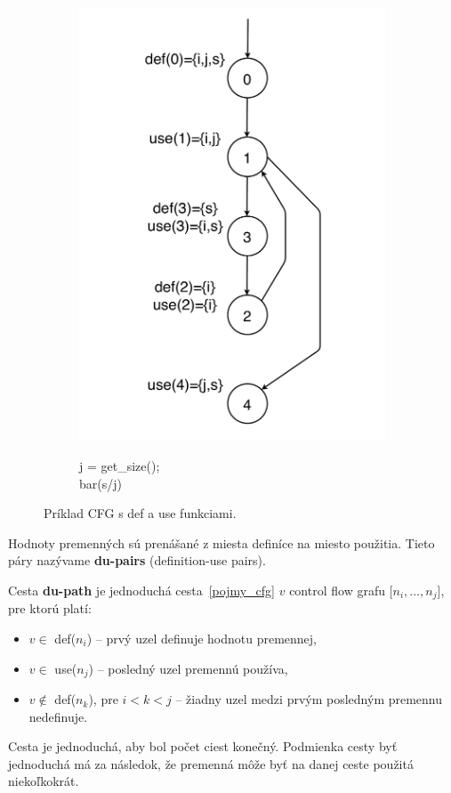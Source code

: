 \begin{figure}[H]
	\begin{subfigure}{0.5\linewidth}
		\centering
		\includegraphics[width=0.8\linewidth]{obrazky/cfg_def_use.pdf}
	\end{subfigure}
	\quad
	\begin{subfigure}{0.5\linewidth}
		\centering
		\begin{algorithm}[H]
			\DontPrintSemicolon
			\LinesNotNumbered
			 j = get\_size(); \\
			bar(s/j)
		\end{algorithm}
	\end{subfigure}
	\caption{Príklad CFG s def a use funkciami.}
\end{figure}

Hodnoty premenných sú prenášané z miesta definíce na miesto použitia.
Tieto páry nazývame \textbf{du-pairs} (definition-use pairs).

Cesta \textbf{du-path} je jednoduchá cesta~\ref{pojmy_cfg} $v$ control flow grafu [$n_i, \ldots, n_j$], pre ktorú platí:
\begin{itemize}
	\item $v \in$ def($n_i$) -- prvý uzel definuje hodnotu premennej,
	\item $v \in$ use($n_j$) -- posledný uzel premennú používa,
	\item $v \not\in$ def($n_k$), pre $i < k < j$ -- žiadny uzel medzi prvým posledným premennu nedefinuje.
\end{itemize}
Cesta je jednoduchá, aby bol počet ciest konečný.
Podmienka cesty byť jednoduchá má za následok, že premenná môže byť na danej ceste použitá niekoľkokrát.



